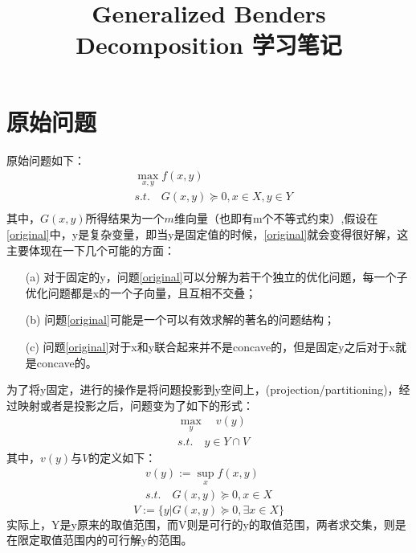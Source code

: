 \documentclass[UTF8,a4]{article}
\begin{document}
\title{Generalized Benders Decomposition 学习笔记}
\maketitle

\section{原始问题}

原始问题如下：
\begin{equation}
\label{original}
\begin{split}
&\max_{x,y}f(x,y)\\
&s.t.\quad G(x,y)\succeq 0,x\in X,y\in Y\\
\end{split}
\end{equation}
其中，$G(x,y)$所得结果为一个$m$维向量（也即有m个不等式约束）,假设在\eqref{original}中，y是复杂变量，即当y是固定值的时候，\eqref{original}就会变得很好解，这主要体现在一下几个可能的方面：
\begin{itemize}
\item[(a)]对于固定的y，问题\eqref{original}可以分解为若干个独立的优化问题，每一个子优化问题都是x的一个子向量，且互相不交叠；
\item[(b)]问题\eqref{original}可能是一个可以有效求解的著名的问题结构；
\item[(c)]问题\eqref{original}对于x和y联合起来并不是concave的，但是固定y之后对于x就是concave的。
\end{itemize}
为了将y固定，进行的操作是将问题投影到y空间上，(projection/partitioning)，经过映射或者是投影之后，问题变为了如下的形式：
\begin{equation}
\label{2}
\begin{split}
&\max_y \quad v(y)\\
&s.t.\quad y\in Y\cap V
\end{split}
\end{equation}
其中，$v(y)$与$V$的定义如下：
\begin{equation}
\label{3}
\begin{split}
v(y):=\sup_x f(x,y)\\
s.t. \quad G(x,y)\succeq 0,x\in X
\end{split}
\end{equation}
\begin{equation}
\label{4}
V:=\{y|G(x,y)\succeq 0,\exists x\in X\}
\end{equation}
实际上，Y是y原来的取值范围，而V则是可行的y的取值范围，两者求交集，则是在限定取值范围内的可行解y的范围。
\end{document}
